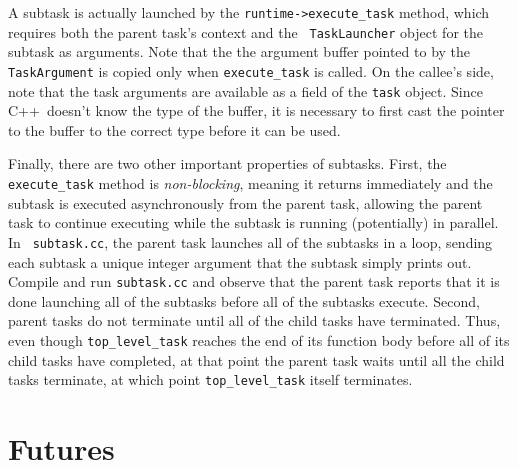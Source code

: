 \documentclass[11pt]{book}
\newcommand{\Cpp}{C++}
\begin{document}
A subtask is actually launched by the {\tt runtime->execute\_task}
method, which requires both the parent task's context and the {\tt
  TaskLauncher} object for the subtask as arguments.  Note that the
the argument buffer pointed to by the {\tt TaskArgument} is copied
only when {\tt execute\_task} is called. On the callee's side, note
that the task arguments are available as a field of the {\tt task}
object. Since \Cpp\ doesn't know the type of the buffer, it is
necessary to first cast the pointer to the buffer to the correct type
before it can be used.

Finally, there are two other important properties of subtasks.  First,
the {\tt execute\_task} method is {\em non-blocking}, meaning it
returns immediately and the subtask is executed asynchronously from
the parent task, allowing the parent task to continue executing while
the subtask is running (potentially) in parallel.  In {\tt
  subtask.cc}, the parent task launches all of the subtasks in a loop,
sending each subtask a unique integer argument that the subtask simply prints
out.  Compile and run {\tt subtask.cc} and observe that the
parent task reports that it is done launching all of the subtasks
before all of the subtasks execute.  Second, parent tasks do not
terminate until all of the child tasks have terminated.  Thus, even
though {\tt top\_level\_task} reaches the end of its function body
before all of its child tasks have completed, at that point the parent
task waits until all the child tasks terminate, at which point
{\tt top\_level\_task} itself terminates.

\section{Futures}
\label{sec:futures}
\end{document}
